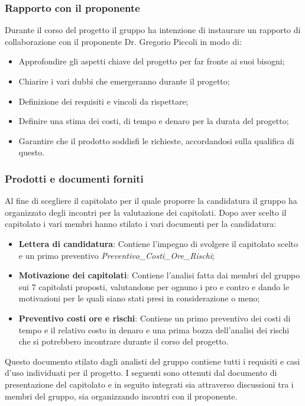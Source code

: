\subsubsection{Rapporto con il proponente}
Durante il corso del progetto il gruppo ha intenzione di instaurare un rapporto di collaborazione con il proponente Dr. Gregorio Piccoli in modo di:
\begin{itemize}
	\item Approfondire gli aspetti chiave del progetto per far fronte ai suoi bisogni;
	\item Chiarire i vari dubbi che emergeranno durante il progetto;
	\item Definizione dei requisiti e vincoli da rispettare;
	\item Definire una stima dei costi, di tempo e denaro per la durata del progetto;
	\item Garantire che il prodotto soddisfi le richieste, accordandosi sulla qualifica di questo.
\end{itemize} 

\subsubsection{Prodotti e documenti forniti}
Al fine di scegliere il capitolato per il quale proporre la candidatura il gruppo ha organizzato degli incontri per la valutazione dei capitolati. Dopo aver scelto il capitolato i vari membri hanno stilato i vari documenti per la candidatura:
\begin{itemize}
	\item \textbf{Lettera di candidatura}: Contiene l'impegno di svolgere il capitolato scelto e un primo preventivo \textit{Preventivo\_Costi\_Ore\_Rischi};
	\item \textbf{Motivazione dei capitolati}: Contiene l'analisi fatta dai membri del gruppo sui 7 capitolati proposti, valutandone per ognuno i pro e contro e dando le motivazioni per le quali siano stati presi in considerazione o meno;
	\item \textbf{Preventivo costi ore e rischi}: Contiene un primo preventivo dei costi di tempo e il relativo costo in denaro e una prima bozza dell'analisi dei rischi che si potrebbero incontrare durante il corso del progetto.
\end{itemize}
Questo documento stilato dagli analisti del gruppo contiene tutti i requisiti e casi d'uso individuati per il progetto. I seguenti sono ottenuti dal documento di presentazione del capitolato e in seguito integrati sia attraverso discussioni tra i membri del gruppo, sia organizzando incontri con il proponente. 
